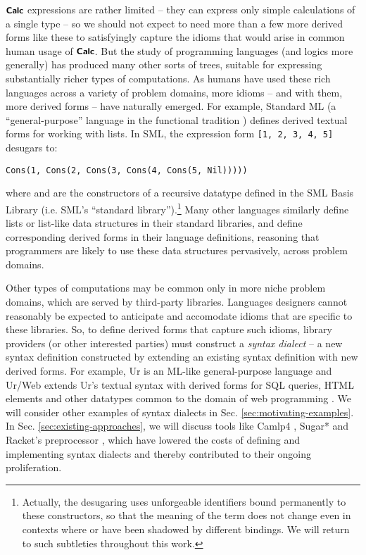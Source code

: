 $\textsf{\textbf{\small Calc}}$ expressions are rather limited -- they can express only simple calculations of a single type -- so we should not expect to need more than a few more derived forms like these to satisfyingly capture the  idioms that would arise in common human usage of $\textsf{\textbf{\small Calc}}$. %
But the study of programming languages (and logics more generally) has produced many other sorts of trees, suitable for expressing substantially richer types of computations.  As humans have used these rich languages across a variety of problem domains, more idioms -- and with them, more derived forms -- have naturally emerged.  For example, Standard ML (a ``general-purpose''  language in the functional tradition \cite{mthm97-for-dart,harper1997programming}) defines derived textual forms for working with lists. In SML, the expression form \lstinline{[1, 2, 3, 4, 5]} desugars to: 
\begin{lstlisting}[numbers=none]
Cons(1, Cons(2, Cons(3, Cons(4, Cons(5, Nil)))))
\end{lstlisting}
where  and  are the constructors of a recursive datatype defined in the SML Basis Library (i.e. SML's ``standard library'').\footnote{Actually, the desugaring uses unforgeable identifiers bound permanently to these constructors, so that the meaning of the term does not change even in contexts where  or  have been shadowed by different bindings. We will return to such subtleties throughout this work.} Many other languages similarly define lists or list-like data structures in their standard libraries, and define corresponding derived forms in their language definitions, reasoning that programmers are likely to use these data structures pervasively, across problem domains.

Other types of computations may be common only in more niche problem domains, which are served by third-party libraries. Languages designers cannot reasonably be expected to anticipate and accomodate idioms that are specific to these libraries. So, to define derived forms that capture such idioms, library providers (or other interested parties) must construct a \emph{syntax dialect} -- a new syntax definition constructed by extending an existing syntax definition with  new derived forms. For example, Ur is an ML-like general-purpose language \cite{conf/pldi/Chlipala10} and Ur/Web extends Ur's textual syntax with derived forms for SQL queries, HTML elements and other datatypes common to the domain of web programming \cite{conf/popl/Chlipala15}. %
We will consider other examples of syntax dialects in Sec. \ref{sec:motivating-examples}. In Sec. \ref{sec:existing-approaches}, we will discuss tools like Camlp4 \cite{ocaml-manual}, Sugar* \cite{erdweg2011sugarj,erdweg2013framework} and Racket's preprocessor \cite{Flatt:2012:CLR:2063176.2063195}, which  have lowered the costs of defining and implementing syntax dialects and thereby contributed to their ongoing proliferation. 


